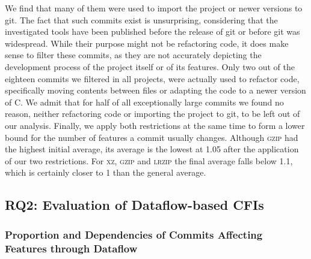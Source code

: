 We find that many of them were used to import the project or newer versions to git.
The fact that such commits exist is unsurprising, considering that the investigated tools have been published before the release of git or before git was widespread.
While their purpose might not be refactoring code, it does make sense to filter these commits, as they are not accurately depicting the development process of the project itself or of its features.
Only two out of the eighteen commits we filtered in all projects, were actually used to refactor code, specifically moving contents between files or adapting the code to a newer version of C.
We admit that for half of all exceptionally large commits we found no reason, neither refactoring code or importing the project to git, to be left out of our analysis.
Finally, we apply both restrictions at the same time to form a lower bound for the number of features a commit usually changes.
Although \textsc{gzip} had the highest initial average, its average is the lowest at 1.05 after the application of our two restrictions.
For \textsc{xz}, \textsc{gzip} and \textsc{lrzip} the final average falls below 1.1, which is certainly closer to 1 than the general average.

\subsection*{\textbf{RQ2: Evaluation of Dataflow-based CFIs}}\label{sec:eval_df_cfis}

\subsubsection*{Proportion and Dependencies of Commits Affecting Features through Dataflow}\label{sec:eval_commit_dfbr}

